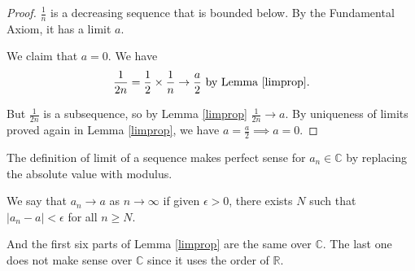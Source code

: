 \begin{proof}
    \(\frac{1}{n}\) is a decreasing sequence that is bounded below. By the Fundamental Axiom, it has a limit \(a\).
    
    We claim that \(a = 0\). We have
    \[
        \frac{1}{2n}=\frac{1}{2}\times \frac{1}{n}\to \frac{a}{2} \text{ by Lemma \eqref{limprop}}.
    \]

    But \(\frac{1}{2n}\) is a subsequence, so by Lemma \eqref{limprop} \(\frac{1}{2n}\to a\). By uniqueness of limits proved again in Lemma \eqref{limprop}, we have \(a = \frac{a}{2} \implies a = 0\).
\end{proof}
\begin{remark}
    The definition of limit of a sequence makes perfect sense for \(a_n \in \mathbb{C}\) by replacing the absolute value with modulus.

    \begin{definition}
    We say that \(a_n \to a\) as \(n \to \infty\) if given \(\epsilon > 0\), there exists \(N\) such that \(\left\vert a_{n}-a \right\vert < \epsilon \) for all \(n \geq N\).
    \end{definition}

    And the first six parts of Lemma \eqref{limprop} are the same over \(\mathbb{C}\). The last one does not make sense over \(\mathbb{C}\) since it uses the order of \(\mathbb{R}\).
\end{remark}